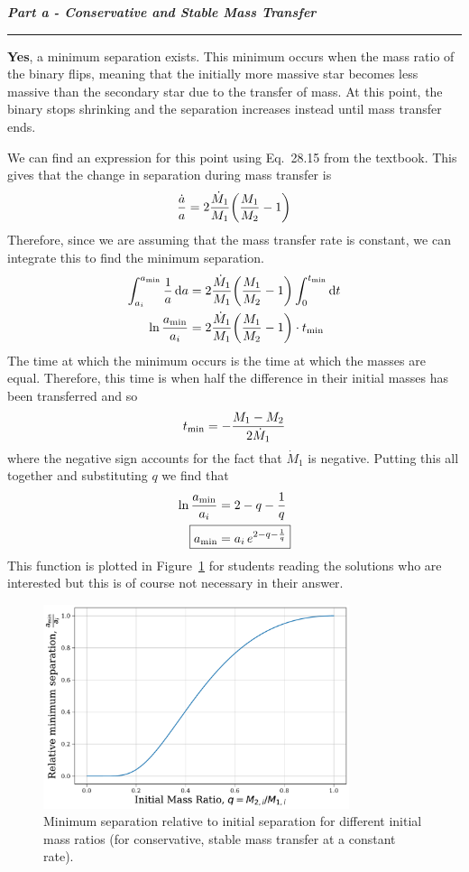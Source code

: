 \documentclass[12pt, letterpaper, twoside]{article}
\newcommand{\question}[1]{{\noindent \it #1}}
\newcommand{\answer}[1]{
    \par\noindent\rule{\textwidth}{0.4pt}#1\vspace{0.5cm}
}
\begin{document}
\question{\textbf{Part a - Conservative and Stable Mass Transfer}}
\answer{
    \textbf{Yes}, a minimum separation exists. This minimum occurs when the mass ratio of the binary flips, meaning that the initially more massive star becomes less massive than the secondary star due to the transfer of mass. At this point, the binary stops shrinking and the separation increases instead until mass transfer ends.

    We can find an expression for this point using Eq.\ 28.15 from the textbook. This gives that the change in separation during mass transfer is
    \begin{equation}
        \frac{\dot{a}}{a} = 2 \frac{\dot{M}_1}{M_1} \qty(\frac{M_1}{M_2} - 1)
    \end{equation}
    Therefore, since we are assuming that the mass transfer rate is constant, we can integrate this to find the minimum separation.
    \begin{align}
        \int_{a_i}^{a_{\rm min}} \frac{1}{a} \dd{a} &= 2 \frac{\dot{M}_1}{M_1} \qty(\frac{M_1}{M_2} - 1) \int_0^{t_{\rm min}} \dd{t} \\
        \ln \frac{a_{\rm min}}{a_i} &= 2 \frac{\dot{M}_1}{M_1} \qty(\frac{M_1}{M_2} - 1) \cdot t_{\rm min}
    \end{align}
    The time at which the minimum occurs is the time at which the masses are equal. Therefore, this time is when half the difference in their initial masses has been transferred and so
    \begin{equation}
        t_{\rm min} = -\frac{M_1 - M_2}{2 \dot{M}_1}
    \end{equation}
    where the negative sign accounts for the fact that $\dot{M}_1$ is negative. Putting this all together and substituting $q$ we find that
    \begin{align}
        \ln \frac{a_{\rm min}}{a_i} &= 2 - q - \frac{1}{q} \\
        \Aboxed{ a_{\rm min} &= a_i \, e^{2 - q - \frac{1}{q}} }
    \end{align}
    This function is plotted in Figure~\ref{fig:min_sep} for students reading the solutions who are interested but this is of course not necessary in their answer.
    \begin{figure}
        \centering
        \includegraphics[width=0.8\textwidth]{relative_min_separation.pdf}
        \caption{Minimum separation relative to initial separation for different initial mass ratios (for conservative, stable mass transfer at a constant rate).}
        \label{fig:min_sep}
    \end{figure}
}
\end{document}
